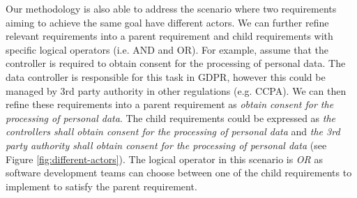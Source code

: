 Our methodology is also able to address the scenario where two requirements aiming to achieve the same goal have different actors. We can further refine relevant requirements into a parent requirement and child requirements with specific logical operators (i.e. AND and OR).  For example, assume that the controller is required to obtain consent for the processing of personal data. The data controller is responsible for this task in GDPR, however this could be managed by 3rd party authority in other regulations (e.g. CCPA). We can then refine these requirements into a parent requirement as \textit{obtain consent for the processing of personal data}. The child requirements could be expressed as \textit{the controllers shall obtain consent for the processing of personal data} and \textit{the 3rd party authority shall obtain consent for the processing of personal data} (see Figure \ref{fig:different-actors}). The logical operator in this scenario is \textit{OR} as software development teams can choose between one of the child requirements to implement to satisfy the parent requirement.


